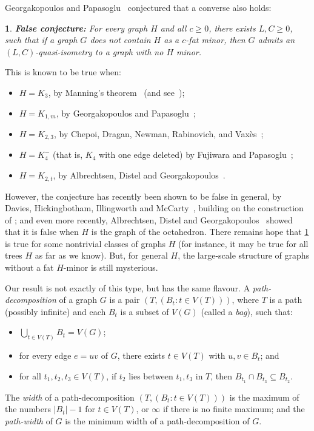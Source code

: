 \documentclass[titlepage,11pt]{article}
\newtheorem{thm}{}[section]
\begin{document}
	Georgakopoulos and Papasoglu~\cite{agelos} conjectured that a converse also holds:
	\begin{thm}\label{fatminorconj}
		{\bf False conjecture:} For every graph $H$ and all $c\ge 0$, there exists $L,C\ge 0$, such that if a graph $G$ does not contain $H$ as a $c$-fat minor, then $G$ admits an $(L,C)$-quasi-isometry to a graph with no $H$ minor.
	\end{thm}
	This is known to be true when:
	\begin{itemize}
		\item $H=K_3$, by Manning's theorem~\cite{manning} (and see~\cite{agelos}); 
		\item $H=K_{1,m}$, by Georgakopoulos and Papasoglu~\cite{agelos};
		\item $H=K_{2,3}$, by Chepoi, Dragan, Newman, Rabinovich, and Vax\`es~\cite{chepoi};
		\item $H=K_4^-$ (that is, $K_4$ with one edge deleted) by Fujiwara and Papasoglu~\cite{fuji};
		\item $H=K_{2,t}$, by Albrechtsen, Distel and Georgakopoulos~\cite{agelos2}.
	\end{itemize}
	However, the conjecture has recently been shown to be false in general, by Davies, Hickingbotham,
	Illingworth and McCarty~\cite{davies}, building on the construction of \cite{coarsemenger}; and even more recently, Albrechtsen, Distel and Georgakopoulos~\cite{agelos3} showed that it is false when
	$H$ is the graph of the octahedron.
	There remains hope that 
	\ref{fatminorconj} is true for some nontrivial classes of graphs $H$ (for instance, it may be true for all trees $H$ as far as we know). But, for general $H$, the large-scale structure of graphs without a fat $H$-minor is still mysterious.
	
	
	Our result is not exactly of this type, but has the same flavour. 
	A {\em path-decomposition} of a graph $G$ is a pair $(T, (B_t:t\in V(T)))$, where $T$ is a path (possibly infinite)
	and each $B_t$ is a subset of $V(G)$ (called a {\em bag}), such that:
	\begin{itemize}
		\item $\bigcup_{t\in V(T)}B_t = V(G)$;
		\item for every edge $e=uv$ of $G$, there exists $t\in V(T)$ with $u,v\in B_t$; and
		\item for all $t_1,t_2,t_3\in V(T)$, if $t_2$ lies between $t_1,t_3$ in $T$, then
		$B_{t_1}\cap B_{t_3}\subseteq B_{t_2}$.
	\end{itemize}
	The {\em width} of a path-decomposition $(T,(B_t:t\in V(T)))$ is the maximum of the numbers $|B_t|-1$ for $t\in V(T)$,
	or $\infty$ if there is no finite maximum;
	and the {\em path-width} of $G$ is the minimum width of a path-decomposition of $G$.
	
\end{document}
